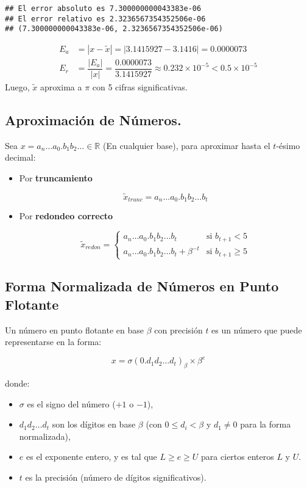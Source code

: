 \documentclass[
]{article}
\providecommand{\tightlist}{%
  \setlength{\itemsep}{0pt}\setlength{\parskip}{0pt}}
\begin{document}
\begin{verbatim}
## El error absoluto es 7.300000000043383e-06
## El error relativo es 2.3236567354352506e-06
## (7.300000000043383e-06, 2.3236567354352506e-06)
\end{verbatim}

\[
\begin{align*}
E_a & = |x - \tilde{x}| = |3.1415927 - 3.1416| = 0.0000073 \\
E_r & = \dfrac{|E_a|}{|x|} = \dfrac{0.0000073}{3.1415927} \approx 0.232 \times 10^{-5}< 0.5 \times 10^{-5}
\end{align*}
\] Luego, \(\tilde{x}\) aproxima a \(\pi\) con 5 cifras significativas.

\subsection{Aproximación de
Números.}\label{aproximaciuxf3n-de-nuxfameros.}

Sea \(x = a_n\ldots a_0.b_1b_2\ldots \in \mathbb{R}\) (En cualquier
base), para aproximar hasta el \(t\)-ésimo decimal:

\begin{itemize}
\tightlist
\item
  Por \textbf{truncamiento}

  \[
  \tilde{x}_{trunc} = a_n\ldots a_0.b_1b_2\ldots b_t
  \]
\item
  Por \textbf{redondeo correcto}

  \[
  \tilde{x}_{redon} = \begin{cases}
  a_n\ldots a_0.b_1b_2\ldots b_t & \text{si } b_{t+1} < 5 \\
  a_n\ldots a_0.b_1b_2\ldots b_t + \beta^{-t} & \text{si } b_{t+1} \geq 5
  \end{cases}
  \]
\end{itemize}

\subsection{Forma Normalizada de Números en Punto
Flotante}\label{forma-normalizada-de-nuxfameros-en-punto-flotante}

Un número en punto flotante en base \(\beta\) con precisión \(t\) es un
número que puede representarse en la forma:

\[x = \sigma (0.d_1d_2\ldots d_t)_{\beta} \times \beta^e\]

donde:

\begin{itemize}
\tightlist
\item
  \(\sigma\) es el signo del número (\(+1\) o \(-1\)),
\item
  \(d_1d_2\ldots d_t\) son los dígitos en base \(\beta\) (con
  \(0 \leq d_i < \beta\) y \(d_1 \neq 0\) para la forma normalizada),
\item
  \(e\) es el exponente entero, y es tal que \(L \geq e \geq U\) para
  ciertos enteros \(L\) y \(U\).
\item
  \(t\) es la precisión (número de dígitos significativos).
\end{itemize}
\end{document}
